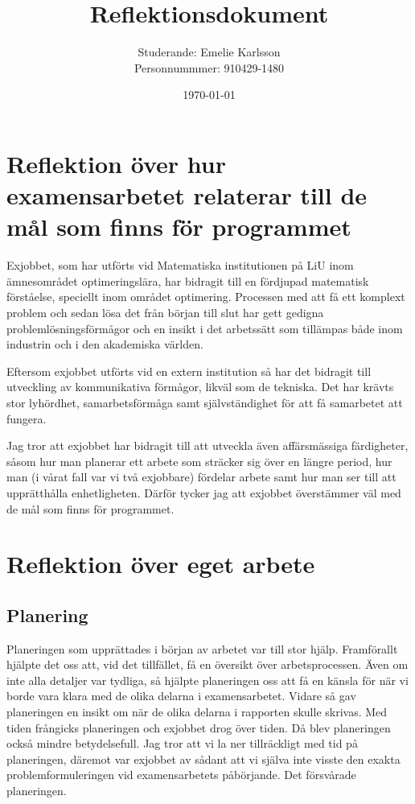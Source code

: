 \documentclass{article}
\title{Reflektionsdokument}
\author{Studerande: Emelie Karlsson \\ Personnummmer: 910429-1480}
\date{\today}
\begin{document}
 
\maketitle

 
\section*{Reflektion över hur examensarbetet relaterar till de mål som finns för programmet}

Exjobbet, som har utförts vid Matematiska institutionen på LiU inom ämnesområdet optimeringslära, har bidragit till en fördjupad matematisk förståelse, speciellt inom området optimering. Processen med att få ett komplext problem och sedan lösa det från början till slut har gett gedigna problemlösningsförmågor och en insikt i det arbetssätt som tillämpas både inom industrin och i den akademiska världen.

Eftersom exjobbet utförts vid en extern institution så har det bidragit till utveckling av kommunikativa förmågor, likväl som de tekniska. Det har krävts stor lyhördhet, samarbetsförmåga samt självständighet för att få samarbetet att fungera. 

Jag tror att exjobbet har bidragit till att utveckla även affärsmässiga färdigheter, såsom hur man planerar ett arbete som sträcker sig över en längre period, hur man (i vårat fall var vi två exjobbare) fördelar arbete samt hur man ser till att upprätthålla enhetligheten. Därför tycker jag att exjobbet överstämmer väl med de mål som finns för programmet.

\section*{Reflektion över eget arbete}

\subsection*{Planering}
Planeringen som upprättades i början av arbetet var till stor hjälp. Framförallt hjälpte det oss att, vid det tillfället, få en översikt över arbetsprocessen. Även om inte alla detaljer var tydliga, så hjälpte planeringen oss att få en känsla för när vi borde vara klara med de olika delarna i examensarbetet. Vidare så gav planeringen en insikt om när de olika delarna i rapporten skulle skrivas. Med tiden frångicks planeringen och exjobbet drog över tiden. Då blev planeringen också mindre betydelsefull. Jag tror att vi la ner tillräckligt med tid på planeringen, däremot var exjobbet av sådant att vi själva inte visste den exakta problemformuleringen vid examensarbetets påbörjande. Det försvårade planeringen.
\end{document}
